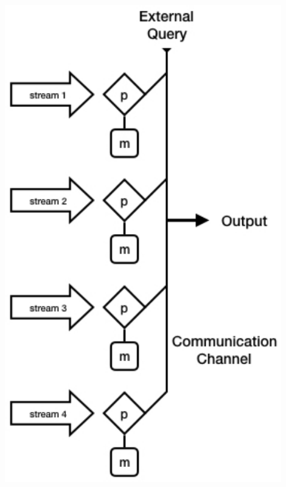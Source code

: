 \documentclass{beamer}
\begin{document}
\begin{frame}
\begin{columns}
\begin{column}{0.4\textwidth}
\begin{center}
	\includegraphics[width=0.9\textwidth]{dist_stream_model}
\end{center}
\end{column}

\end{columns}
\end{frame}
\end{document}
